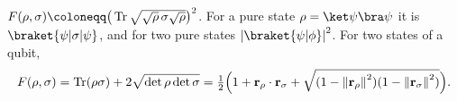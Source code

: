 \documentclass[handoutsbeamer.tex]{subfiles}
\begin{document}
\begin{frame}
\begin{defn}[Fidelity]\label{def:ch07:fidelity}
$\Fid(\rho,\sigma)\coloneqq\big(\Tr\sqrt{\sqrt\rho\,\sigma\sqrt\rho}\big)^2$. For a pure state $\rho=\ket\psi\bra\psi$ it is $\braket{\psi|\sigma|\psi}$, and for two pure states $\abs{\braket{\psi|\phi}}^2$. For two states of a qubit,
\begin{equation}\label{eq:ch07:qubitfid}
    F(\rho,\sigma)=\operatorname{Tr}(\rho\sigma)+2\sqrt{\det\rho\det\sigma}=\tfrac12\Big(1+\mathbf{r}_\rho\cdot\mathbf{r}_\sigma+\sqrt{(1-\left\lVert \mathbf{r}_\rho \right\rVert^2)(1-\left\lVert \mathbf{r}_\sigma \right\rVert^2)}\Big).
\end{equation}
\end{defn}
\end{frame}
\end{document}
